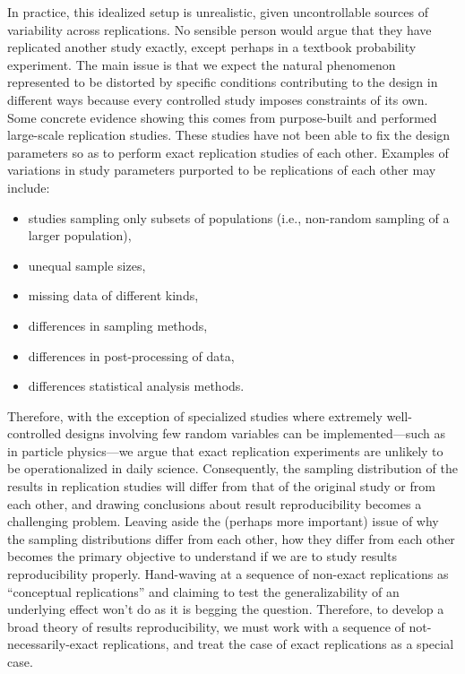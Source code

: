 \documentclass[meta,authordate]{jote-new-article}
\newcounter{result}
\begin{document}
In practice, this idealized setup is unrealistic, given uncontrollable sources of variability across replications. No sensible person would argue that they have replicated another study exactly, except perhaps in a textbook probability experiment. The main issue is that we expect the natural phenomenon represented to be distorted by specific conditions contributing to the design in different ways because every controlled study imposes constraints of its own. Some concrete evidence showing this comes from purpose-built and performed large-scale replication studies. These studies have not been able to fix the design parameters so as to perform exact replication studies of each other. Examples of variations in study parameters purported to be replications of each other may include:
\newpage
\begin{itemize}
  \item studies sampling only subsets of populations (i.e., non-random sampling of a larger population),
  \item unequal sample sizes,
  \item missing data of different kinds,
  \item differences in sampling methods,
  \item differences in post-processing of data,
  \item differences statistical analysis methods.
\end{itemize}
Therefore, with the exception of specialized studies where extremely well-controlled designs involving few random variables can be implemented---such as in particle physics---we argue that exact replication experiments are unlikely to be operationalized in daily science. Consequently, the sampling distribution of the results in replication studies will differ from that of the original study or from each other, and drawing conclusions about result reproducibility becomes a challenging problem. Leaving aside the (perhaps more important) issue of why the sampling distributions differ from each other, how they differ from each other becomes the primary objective to understand if we are to study results reproducibility properly. Hand-waving at a sequence of non-exact replications as ``conceptual replications'' and claiming to test the generalizability of an underlying effect won't do as it is begging the question. Therefore, to develop a broad theory of results reproducibility, we must work with a sequence of not-necessarily-exact replications, and treat the case of exact replications as a special case.
\end{document}
